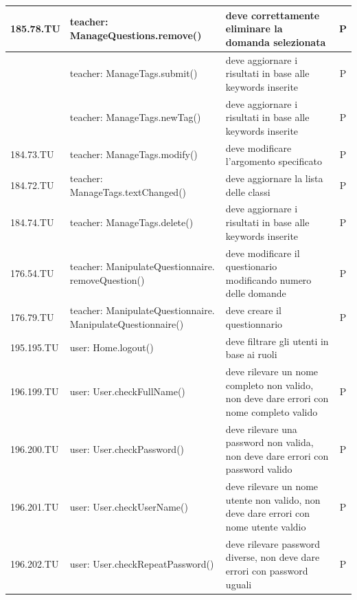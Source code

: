 \documentclass[12pt,a4paper]{article}
\begin{document}
\begin{center}
\begin{longtable}[H]{l p{} p{} c}
	185.78.TU& teacher: \newline  ManageQuestions.remove() & deve correttamente eliminare la domanda selezionata& P \\ \midrule
	& teacher: \newline  ManageTags.submit() & deve aggiornare i risultati in base alle keywords inserite & P\\ \midrule
	& teacher: \newline  ManageTags.newTag() & deve aggiornare i risultati in base alle keywords inserite& P \\ \midrule
	184.73.TU& teacher: \newline  ManageTags.modify() & deve modificare l'argomento specificato& P \\ \midrule
	184.72.TU& teacher: \newline  ManageTags.textChanged() & deve aggiornare la lista delle classi & P \\ \midrule
	184.74.TU& teacher: \newline  ManageTags.delete() & deve aggiornare i risultati in base alle keywords inserite & P \\ \midrule
	176.54.TU& teacher: \newline  ManipulateQuestionnaire. \newline removeQuestion() & deve modificare il questionario modificando numero delle domande  & P\\ \midrule
176.79.TU	& teacher: \newline  ManipulateQuestionnaire. \newline ManipulateQuestionnaire() & deve creare il questionnario  & P\\ \midrule
	195.195.TU & user: Home.logout() & deve filtrare gli utenti in base ai ruoli\\ \midrule
	196.199.TU& user: \newline  User.checkFullName() & deve rilevare un nome completo non valido, non deve dare errori con nome completo valido  & P\\ \midrule
	196.200.TU& user: \newline  User.checkPassword() & deve rilevare una password non valida, non deve dare errori con password valido  & P\\ \midrule
	196.201.TU& user: \newline  User.checkUserName() & deve rilevare un nome utente non valido, non deve dare errori con nome utente valdio & P \\ \midrule
		196.202.TU& user: \newline  User.checkRepeatPassword() & deve rilevare password diverse, non deve dare errori con password uguali  & P\\ \midrule

\end{longtable}
\end{center}
\end{document}
